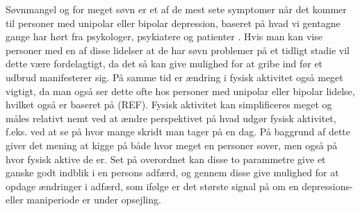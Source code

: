 Søvnmangel og for meget søvn er et af de mest sete symptomer når det kommer til personer med unipolar eller bipolar depression, baseret på hvad vi gentagne gange har hørt fra psykologer, psykiatere og patienter \citep{misc:jorgen-aagaard, misc:janne-rasmussen, misc:faellesrapp}.
Hvis man kan vise personer med en af disse lidelser at de har søvn problemer på et tidligt stadie vil dette være fordelagtigt, da det så kan give mulighed for at gribe ind før et udbrud manifesterer sig.
På samme tid er ændring i fysisk aktivitet også meget vigtigt, da man også ser dette ofte hos personer med unipolar eller bipolar lidelse, hvilket også er baseret på (REF).
Fysisk aktivitet kan simplificeres meget og måles relativt nemt ved at ændre perspektivet på hvad udgør fysisk aktivitet, f.eks. ved at se på hvor mange skridt man tager på en dag.
På baggrund af dette giver det mening at kigge på både hvor meget en personer sover, men også på hvor fysisk aktive de er.
Set på overordnet kan disse to parammetre give et ganske godt indblik i en persons adfærd, og gennem disse give mulighed for at opdage ændringer i adfærd, som ifølge \citet{misc:jorgen-aagaard} er det største signal på om en depressions- eller maniperiode er under opsejling. 

